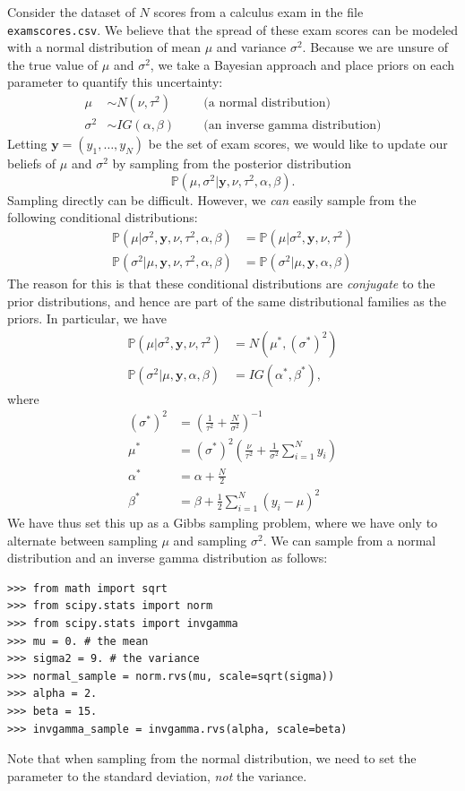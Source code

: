 Consider the dataset of $N$ scores from a calculus exam in the file \texttt{examscores.csv}. We believe that the spread of these exam scores can be
modeled with a normal distribution of mean $\mu$ and variance $\sigma^{2}$.
Because we are unsure of the true value of $\mu$ and $\sigma^2$, we take a Bayesian approach and place priors on each parameter to quantify this uncertainty:
\begin{align*}
\mu & \sim N(\nu, \tau^{2})\quad &&\text{(a normal distribution)} \\
\sigma^{2} & \sim IG(\alpha, \beta) &&\text{(an inverse gamma distribution)}
\end{align*}
Letting $\mathbf{y} = (y_1,\ldots,y_N)$ be the set of exam scores, we would like to update our beliefs of $\mu$ and $\sigma^2$ by sampling from the posterior
distribution
\begin{equation*}
\mathbb{P}(\mu, \sigma^{2} | \mathbf{y}, \nu, \tau^{2}, \alpha, \beta).
\end{equation*}
Sampling directly can be difficult. However, we \emph{can} easily sample from the following conditional distributions:
\begin{align*}
\mathbb{P}(\mu | \sigma^{2}, \mathbf{y}, \nu, \tau^{2}, \alpha, \beta) & = \mathbb{P}(\mu | \sigma^{2}, \mathbf{y}, \nu, \tau^{2})\\
\mathbb{P}(\sigma^{2} | \mu, \mathbf{y}, \nu, \tau^{2}, \alpha, \beta) & = \mathbb{P}(\sigma^{2} | \mu, \mathbf{y}, \alpha, \beta)
\end{align*}
The reason for this is that these conditional distributions are \emph{conjugate} to the prior distributions, and hence are part of the same distributional
families as the priors. In particular, we have
\begin{align*}
\mathbb{P}(\mu | \sigma^{2}, \mathbf{y}, \nu, \tau^{2}) &= N(\mu^*, (\sigma^*)^2)\\
\mathbb{P}(\sigma^{2} | \mu, \mathbf{y}, \alpha, \beta) &= IG(\alpha^*, \beta^*),
\end{align*}
where
\begin{align*}
(\sigma^*)^2 &= \left(\frac{1}{\tau^2}+\frac{N}{\sigma^2}\right)^{-1}\\
\mu^* &= (\sigma^*)^2\left(\frac{\nu}{\tau^2} + \frac{1}{\sigma^2}\sum_{i=1}^N y_i \right)\\
\alpha^* &= \alpha + \frac{N}{2}\\
\beta^* &= \beta + \frac{1}{2}\sum_{i=1}^N (y_i-\mu)^2
\end{align*}
We have thus set this up as a Gibbs sampling problem, where we have only to alternate between sampling $\mu$ and sampling $\sigma^{2}$.
We can sample from a normal distribution and an inverse gamma distribution as follows:
\begin{lstlisting}
>>> from math import sqrt
>>> from scipy.stats import norm
>>> from scipy.stats import invgamma
>>> mu = 0. # the mean
>>> sigma2 = 9. # the variance
>>> normal_sample = norm.rvs(mu, scale=sqrt(sigma))
>>> alpha = 2.
>>> beta = 15.
>>> invgamma_sample = invgamma.rvs(alpha, scale=beta)
\end{lstlisting}
Note that when sampling from the normal distribution, we need to set the  parameter to the standard deviation, \emph{not} the variance.

